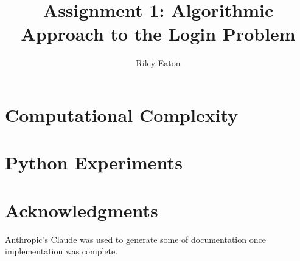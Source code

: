 \documentclass[acmsmall,screen]{acmart}
\title{Assignment 1: Algorithmic Approach to the Login Problem}
\author{Riley Eaton}
\affiliation{%
  \institution{University of British Columbia}
  \city{Kelowna}
  \state{BC}
  \country{Canada}
}
\begin{document}
\fancyfoot{} %

\maketitle

\section{Computational Complexity} \label{sec:complexity}


\section{Python Experiments} \label{sec:experiments}





\section*{Acknowledgments}
Anthropic's Claude was used to generate some of documentation once implementation was complete.
\end{document}
